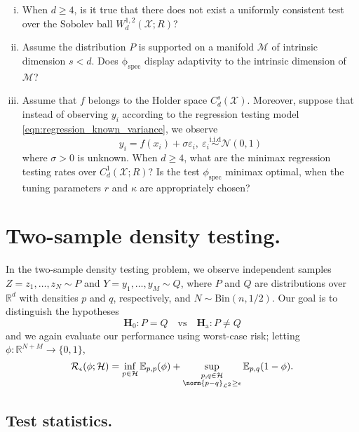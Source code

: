 \documentclass{article}
\newcommand{\Reals}{\mathbb{R}}
\newcommand{\1}{\mathbf{1}}
\newcommand{\Leb}{\mathcal{L}}
\newcommand{\Ebb}{\mathbb{E}}
\theoremstyle{alden}
\theoremstyle{aldenthm}
\theoremstyle{definition}
\theoremstyle{remark}
\begin{document}
\begin{enumerate}[(i)]
	\item When $d \geq 4$, is it true that there does not exist a uniformly consistent
	test over the Sobolev ball $W_d^{1,2}(\mathcal{X};R)$?
	\item Assume the distribution $P$ is supported on a manifold $\mathcal{M}$ of intrinsic dimension $s < d$. Does $\mathrm{\phi_{\mathrm{spec}}}$ display adaptivity to the intrinsic dimension of $\mathcal{M}$?
	\item Assume that $f$ belongs to the Holder space $C_d^s(\mathcal{X})$. Moreover, suppose that instead of observing ${y_i}$ according to the regression testing model \eqref{eqn:regression_known_variance}, we observe
	\begin{equation*}
	y_i = f(x_i) + \sigma \varepsilon_i, ~\varepsilon_i \overset{\textrm{i.i.d}}{\sim} \mathcal{N}(0,1)
	\end{equation*}
	where $\sigma > 0$ is unknown. When $d \geq 4$, what are the minimax regression testing rates over $C_d^1(\mathcal{X};R)$? Is the test $\phi_{\mathrm{spec}}$ minimax optimal, when the tuning parameters $r$ and $\kappa$ are appropriately chosen?
\end{enumerate}

\section{Two-sample density testing.}
In the two-sample density testing problem, we observe independent samples $Z = z_1,\ldots,z_N \sim P$ and $Y = y_1,\ldots,y_M \sim Q$, where $P$ and $Q$ are distributions over $\Reals^d$ with densities $p$ and $q$, respectively, and $N \sim \textrm{Bin}(n,1/2)$. Our goal is to distinguish the hypotheses
\begin{equation*}
\mathbf{H}_0: P = Q \quad \textrm{vs} \quad \mathbf{H}_{\textrm{a}}: P \neq Q
\end{equation*}
and we again evaluate our performance using worst-case risk; letting $\phi:\Reals^{N + M} \to \{0,1\}$, 
\begin{equation*}
\mathcal{R}_{\epsilon}(\phi; \mathcal{H}) = \inf_{p \in \mathcal{H}}\Ebb_{p,p}(\phi) + \sup_{\substack{p,q \in \mathcal{H} \\ \norm{p - q}_{\Leb^2} \geq \epsilon}} \Ebb_{p,q}(1 - \phi).
\end{equation*}

\subsection{Test statistics.}
\end{document}
